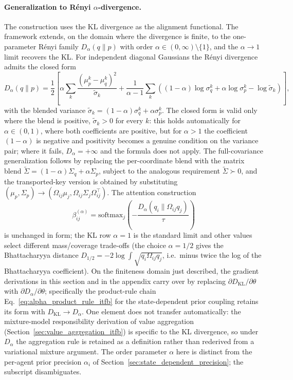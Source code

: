 \documentclass[11pt]{article}
\begin{document}
\paragraph{Generalization to R\'enyi $\alpha$-divergence.}
The construction uses the KL divergence as the alignment functional. The framework extends, on the domain where the divergence is finite, to the one-parameter R\'enyi family $D_\alpha(q \| p)$ with order $\alpha \in (0, \infty) \setminus \{1\}$, and the $\alpha \to 1$ limit recovers the KL. For independent diagonal Gaussians the R\'enyi divergence admits the closed form
\begin{equation}
D_\alpha(q \| p) = \frac{1}{2}\left[ \alpha \sum_k \frac{(\mu_p^k - \mu_q^k)^2}{\tilde\sigma_k} + \frac{1}{\alpha - 1} \sum_k \left((1-\alpha)\log \sigma_q^k + \alpha \log \sigma_p^k - \log \tilde\sigma_k\right) \right],
\label{eq:renyi_diagonal_itfb}
\end{equation}
with the blended variance $\tilde\sigma_k = (1-\alpha)\sigma_q^k + \alpha\sigma_p^k$. The closed form is valid only where the blend is positive, $\tilde\sigma_k > 0$ for every $k$: this holds automatically for $\alpha \in (0,1)$, where both coefficients are positive, but for $\alpha > 1$ the coefficient $(1-\alpha)$ is negative and positivity becomes a genuine condition on the variance pair; where it fails, $D_\alpha = +\infty$ and the formula does not apply. The full-covariance generalization follows by replacing the per-coordinate blend with the matrix blend $\tilde\Sigma = (1-\alpha)\Sigma_q + \alpha \Sigma_p$, subject to the analogous requirement $\tilde\Sigma \succ 0$, and the transported-key version is obtained by substituting $(\mu_p, \Sigma_p) \to (\Omega_{ij}\mu_j, \Omega_{ij}\Sigma_j\Omega_{ij}^\top)$. The attention construction
\begin{equation}
\beta_{ij}^{(\alpha)} = \mathrm{softmax}_j\left(-\frac{D_\alpha(q_i \| \Omega_{ij} q_j)}{\tau}\right)
\label{eq:renyi_attention_itfb}
\end{equation}
is unchanged in form; the KL row $\alpha = 1$ is the standard limit and other values select different mass/coverage trade-offs (the choice $\alpha = 1/2$ gives the Bhattacharyya distance $D_{1/2} = -2\log\int\sqrt{q_i \Omega_{ij}q_j}$, i.e.\ minus twice the log of the Bhattacharyya coefficient). On the finiteness domain just described, the gradient derivations in this section and in the appendix carry over by replacing $\partial D_{\mathrm{KL}}/\partial \theta$ with $\partial D_\alpha/\partial \theta$; specifically the product-rule chain Eq.~\eqref{eq:alpha_product_rule_itfb} for the state-dependent prior coupling retains its form with $D_{\mathrm{KL}} \to D_\alpha$. One element does not transfer automatically: the mixture-model responsibility derivation of value aggregation (Section~\ref{sec:value_aggregation_itfb}) is specific to the KL divergence, so under $D_\alpha$ the aggregation rule is retained as a definition rather than rederived from a variational mixture argument. The order parameter $\alpha$ here is distinct from the per-agent prior precision $\alpha_i$ of Section~\ref{sec:state_dependent_precision}; the subscript disambiguates.
\end{document}
